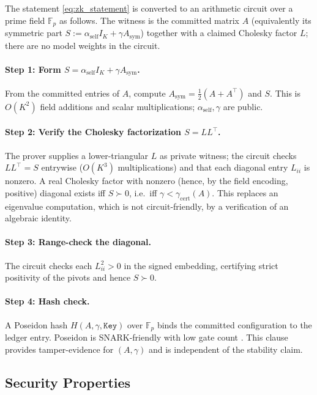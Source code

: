 \documentclass[12pt]{article}
\theoremstyle{plain}
\theoremstyle{definition}
\begin{document}
The statement \eqref{eq:zk_statement} is converted to an arithmetic
circuit over a prime field $\mathbb{F}_p$ as follows.  The witness is the
committed matrix $A$ (equivalently its symmetric part $S:=\alpha_{\mathrm{self}}I_K+\gamma A_{\mathrm{sym}}$)
together with a claimed Cholesky factor $L$; there are no model weights in
the circuit.

\paragraph{Step 1: Form $S=\alpha_{\mathrm{self}}I_K+\gamma A_{\mathrm{sym}}$.}
From the committed entries of $A$, compute $A_{\mathrm{sym}}=\tfrac12(A+A^\top)$
and $S$.  This is $O(K^2)$ field additions and scalar multiplications;
$\alpha_{\mathrm{self}},\gamma$ are public.

\paragraph{Step 2: Verify the Cholesky factorization $S=LL^\top$.}
The prover supplies a lower-triangular $L$ as private witness; the circuit
checks $LL^\top=S$ entrywise ($O(K^3)$ multiplications) and that each
diagonal entry $L_{ii}$ is nonzero.  A real Cholesky factor with nonzero
(hence, by the field encoding, positive) diagonal exists iff $S\succ0$, i.e.\
iff $\gamma<\gamma_{\mathrm{cert}}(A)$.  This replaces an eigenvalue
computation, which is not circuit-friendly, by a verification of an
algebraic identity.

\paragraph{Step 3: Range-check the diagonal.}
The circuit checks each $L_{ii}^2>0$ in the signed embedding, certifying
strict positivity of the pivots and hence $S\succ0$.

\paragraph{Step 4: Hash check.}
A Poseidon hash $H(A,\gamma,\mathtt{Key})$ over $\mathbb{F}_p$ binds the
committed configuration to the ledger entry.  Poseidon is SNARK-friendly
with low gate count \cite{grassi2021poseidon}.  This clause provides
tamper-evidence for $(A,\gamma)$ and is independent of the stability claim.

\subsection{Security Properties}
\end{document}
